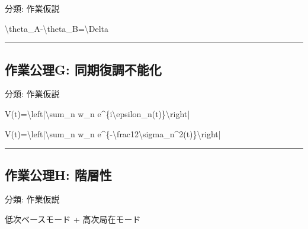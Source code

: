 \documentclass[
  a4paper,
]{ltjsarticle}
\newenvironment{Shaded}{}{}
\newcommand{\NormalTok}[1]{#1}
\begin{document}
分類: 作業仮説

\begin{Shaded}
\begin{Highlighting}[]
\NormalTok{\textbackslash{}theta\_A{-}\textbackslash{}theta\_B=\textbackslash{}Delta}
\end{Highlighting}
\end{Shaded}

\begin{center}\rule{0.5\linewidth}{0.5pt}\end{center}

\subsection{作業公理G:
同期復調不能化}\label{ux4f5cux696dux516cux7406g-ux540cux671fux5fa9ux8abfux4e0dux80fdux5316}

分類: 作業仮説

\begin{Shaded}
\begin{Highlighting}[]
\NormalTok{V(t)=\textbackslash{}left|\textbackslash{}sum\_n w\_n e\^{}\{i\textbackslash{}epsilon\_n(t)\}\textbackslash{}right|}
\end{Highlighting}
\end{Shaded}

\begin{Shaded}
\begin{Highlighting}[]
\NormalTok{V(t)=\textbackslash{}left|\textbackslash{}sum\_n w\_n e\^{}\{{-}\textbackslash{}frac12\textbackslash{}sigma\_n\^{}2(t)\}\textbackslash{}right|}
\end{Highlighting}
\end{Shaded}

\begin{center}\rule{0.5\linewidth}{0.5pt}\end{center}

\subsection{作業公理H:
階層性}\label{ux4f5cux696dux516cux7406h-ux968eux5c64ux6027}

分類: 作業仮説

\begin{Shaded}
\begin{Highlighting}[]
\NormalTok{低次ベースモード}
\NormalTok{+ 高次局在モード}
\end{Highlighting}
\end{Shaded}
\end{document}
